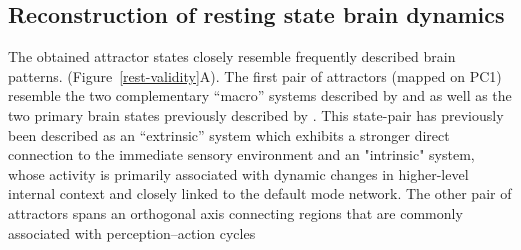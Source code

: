 \documentclass{article}
\begin{document}
\subsection{Reconstruction of resting state brain dynamics}\label{Reconstruction of resting state brain dynamics}

The obtained attractor states closely resemble frequently described brain patterns. (Figure~\ref{rest-validity}A).
The first pair of attractors (mapped on PC1) resemble the two complementary ``macro'' systems described by \href{https://doi.org/10.1016/j.neuropsychologia.2007.10.003}{} and \href{https://doi.org/10.1371/journal.pone.0115913}{} as well as the two primary brain states previously described by \href{https://doi.org/10.1089/brain.2018.0586}{}. This state-pair has previously been described as an ``extrinsic'' system which exhibits a stronger direct connection to the immediate sensory environment and an "intrinsic" system, whose activity is primarily associated with dynamic changes in higher-level internal context and closely linked to the default mode network.
The other pair of attractors spans an orthogonal axis connecting regions that are commonly associated with perception--action cycles \href{https://doi.org/10.1016/j.tics.2004.02.004}{}
\end{document}
